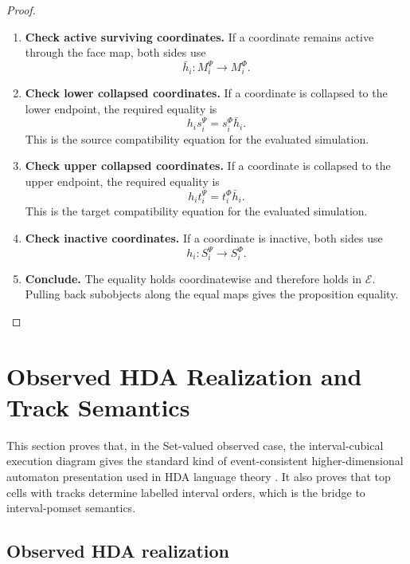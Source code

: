\begin{proof}
    \leavevmode
    \begin{enumerate}
        \item \textbf{Check active surviving coordinates.}
        If a coordinate remains active through the face map, both sides use
        \[
            \bar h_i:M_i^\Psi\to M_i^\Phi.
        \]

        \item \textbf{Check lower collapsed coordinates.}
        If a coordinate is collapsed to the lower endpoint, the required
        equality is
        \[
            h_i s_i^\Psi=s_i^\Phi\bar h_i.
        \]
        This is the source compatibility equation for the evaluated
        simulation.

        \item \textbf{Check upper collapsed coordinates.}
        If a coordinate is collapsed to the upper endpoint, the required
        equality is
        \[
            h_i t_i^\Psi=t_i^\Phi\bar h_i.
        \]
        This is the target compatibility equation for the evaluated
        simulation.

        \item \textbf{Check inactive coordinates.}
        If a coordinate is inactive, both sides use
        \[
            h_i:S_i^\Psi\to S_i^\Phi.
        \]

        \item \textbf{Conclude.}
        The equality holds coordinatewise and therefore holds in
        \(\mathcal E\). Pulling back subobjects along the equal maps gives
        the proposition equality.
    \end{enumerate}
\end{proof}

\section{Observed HDA Realization and Track Semantics}
\label{sec:cmett-observed-hda-realization-track-semantics}

This section proves that, in the Set-valued observed case, the
interval-cubical execution diagram gives the standard kind of event-consistent
higher-dimensional automaton presentation used in HDA language theory
\cite{FahrenbergJohansenStruthZiemianski2021,Fahrenberg_2024}.
It also proves that top cells with tracks determine labelled interval orders,
which is the bridge to interval-pomset semantics.

\subsection{Observed HDA realization}
\label{subsec:cmett-observed-hda-realization}

